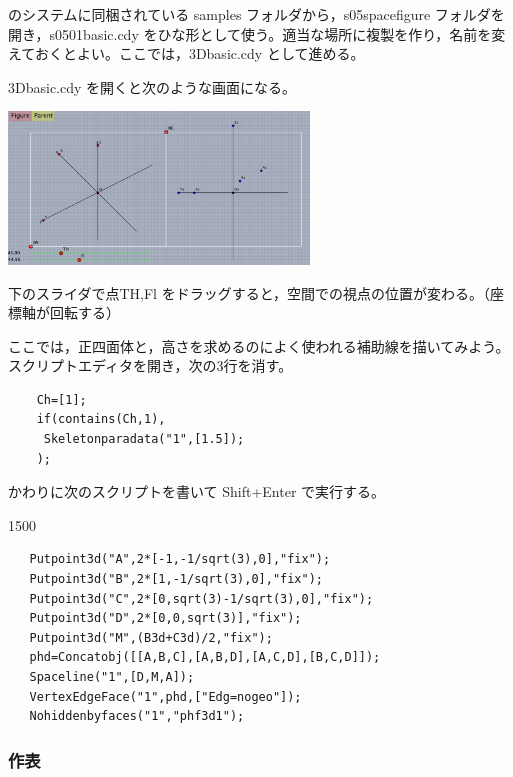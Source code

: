 \documentclass[papersize,a4paper,12pt,uplatex]{jsarticle}
\begin{document}
\ketcindy のシステムに同梱されている samples フォルダから，s05spacefigure フォルダを開き，s0501basic.cdy をひな形として使う。適当な場所に複製を作り，名前を変えておくとよい。ここでは，3Dbasic.cdy として進める。

3Dbasic.cdy を開くと次のような画面になる。

\vspace{\baselineskip}
\begin{center}
 \includegraphics[bb=0 0 879.05 447.02 , width=8cm]{Fig/3dstart.pdf}
\end{center}

下のスライダで点TH,Fl をドラッグすると，空間での視点の位置が変わる。（座標軸が回転する）

ここでは，正四面体と，高さを求めるのによく使われる補助線を描いてみよう。スクリプトエディタを開き，次の3行を消す。

\begin{verbatim}
    Ch=[1];
    if(contains(Ch,1),
     Skeletonparadata("1",[1.5]);
    );
\end{verbatim}

かわりに次のスクリプトを書いて Shift+Enter で実行する。

\begin{layer}{150}{0}
\end{layer}
\begin{verbatim}
   Putpoint3d("A",2*[-1,-1/sqrt(3),0],"fix");
   Putpoint3d("B",2*[1,-1/sqrt(3),0],"fix");
   Putpoint3d("C",2*[0,sqrt(3)-1/sqrt(3),0],"fix");
   Putpoint3d("D",2*[0,0,sqrt(3)],"fix");
   Putpoint3d("M",(B3d+C3d)/2,"fix");
   phd=Concatobj([[A,B,C],[A,B,D],[A,C,D],[B,C,D]]);
   Spaceline("1",[D,M,A]);
   VertexEdgeFace("1",phd,["Edg=nogeo"]);
   Nohiddenbyfaces("1","phf3d1");
\end{verbatim}


\subsubsection{作表}
\end{document}

